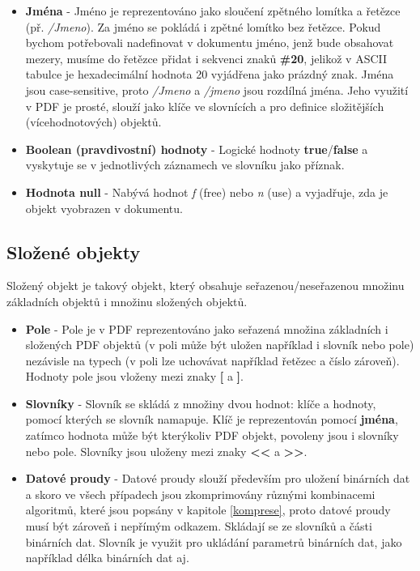 \begin{itemize}
		\item \textbf{Jména} - Jméno je reprezentováno jako sloučení zpětného lomítka a řetězce (př. \textit{/Jmeno}). Za jméno se pokládá i zpětné lomítko bez řetězce. Pokud bychom potřebovali nadefinovat v dokumentu jméno, jenž bude obsahovat mezery, musíme do řetězce přidat i sekvenci znaků \textbf{\#20}, jelikož v ASCII tabulce je hexadecimální hodnota 20 vyjádřena jako prázdný znak. Jména jsou case-sensitive, proto \textit{/Jmeno} a \textit{/jmeno} jsou rozdílná jména. Jeho využití v PDF je prosté, slouží jako klíče ve slovnících a pro definice složitějších (vícehodnotových) objektů.
		\item \textbf{Boolean (pravdivostní) hodnoty} - Logické hodnoty \textbf{true}/\textbf{false} a vyskytuje se v jednotlivých záznamech ve slovníku jako příznak.
		\item \textbf{Hodnota null} - Nabývá hodnot \textit{f} (free) nebo \textit{n} (use) a vyjadřuje, zda je objekt vyobrazen v dokumentu.
	\end{itemize}
\subsection{Složené objekty}	
Složený objekt je takový objekt, který obsahuje seřazenou/neseřazenou množinu základních objektů i množinu složených objektů.
	\begin{itemize}
		\item \textbf{Pole} - Pole je v PDF reprezentováno jako seřazená množina základních i složených PDF objektů (v poli může být uložen například i slovník nebo pole) nezávisle na typech (v poli lze uchovávat například řetězec a číslo zároveň). Hodnoty pole jsou vloženy mezi znaky \textbf{[} a \textbf{]}.
		\item \textbf{Slovníky} - Slovník se skládá z množiny dvou hodnot: klíče a hodnoty, pomocí kterých se slovník namapuje. Klíč je reprezentován pomocí \textbf{jména}, zatímco hodnota může být kterýkoliv PDF objekt, povoleny jsou i slovníky nebo pole. Slovníky jsou uloženy mezi znaky \textbf{<<} a \textbf{>>}.
		\item \textbf{Datové proudy} - Datové proudy slouží především pro uložení binárních dat a skoro ve všech případech jsou zkomprimovány různými kombinacemi algoritmů, které jsou popsány v kapitole \ref{komprese}, proto datové proudy musí být zároveň i nepřímým odkazem. Skládají se ze slovníků a části binárních dat. Slovník je využit pro ukládání parametrů binárních dat, jako například délka binárních dat aj.
	\end{itemize}
